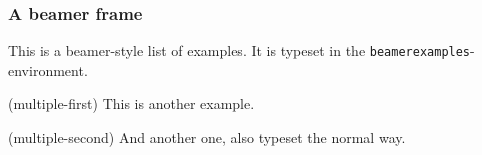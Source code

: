 \documentclass{beamer}
\begin{document}
	\begin{frame}
		\frametitle{A beamer frame}
		\begin{beamerexamples}
			This is a beamer-style list of examples.  It is typeset in the \texttt{beamerexamples}-environment.
		\end{beamerexamples}
		
		\begin{examples}
		 	 \item(multiple-first) This is another example.
		 	 \item(multiple-second) And another one, also typeset the normal way.
		\end{examples}
	\end{frame}
\end{document}
